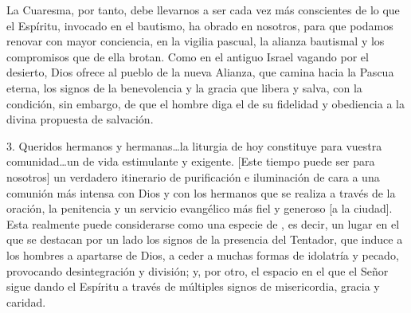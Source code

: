 \begin{body}
La Cuaresma, por tanto, debe llevarnos a ser cada vez más conscientes de lo que el Espíritu, invocado en el bautismo, ha obrado en nosotros, para que podamos renovar con mayor conciencia, en la vigilia pascual, la alianza bautismal y los compromisos que de ella brotan. Como en el antiguo Israel vagando por el desierto, Dios ofrece al pueblo de la nueva Alianza, que camina hacia la Pascua eterna, los signos de la benevolencia y la gracia que libera y salva, con la condición, sin embargo, de que el hombre diga el  de su fidelidad y obediencia a la divina propuesta de salvación.

3. Queridos hermanos y hermanas\ldots la liturgia de hoy constituye para vuestra comunidad\ldots un  de vida estimulante y exigente. [Este tiempo puede ser para nosotros] un verdadero itinerario de purificación e iluminación de cara a una comunión más intensa con Dios y con los hermanos que se realiza a través de la oración, la penitencia y un servicio evangélico más fiel y generoso [a la ciudad]. Esta realmente puede considerarse como una especie de , es decir, un lugar en el que se destacan por un lado los signos de la presencia del Tentador, que induce a los hombres a apartarse de Dios, a ceder a muchas formas de idolatría y pecado, provocando desintegración y división; y, por otro, el espacio en el que el Señor sigue dando el Espíritu a través de múltiples signos de misericordia, gracia y caridad.



\end{body}
